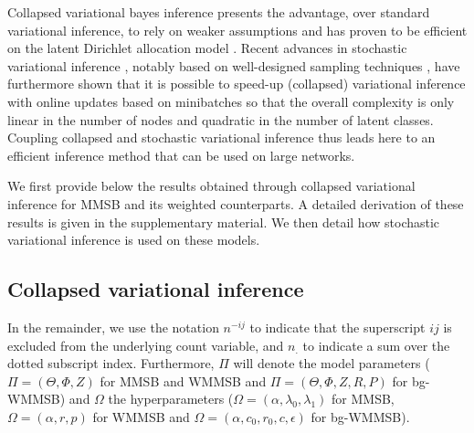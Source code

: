 Collapsed variational bayes inference presents the advantage, over standard variational inference, to rely on weaker assumptions and has proven to be efficient on the latent Dirichlet allocation model \cite{teh2006collapsed}. Recent advances in stochastic variational inference \cite{hoffman2013stochastic}, notably based on well-designed sampling techniques \cite{gopalan2013efficient,kim2013efficient}, have furthermore shown that it is possible to speed-up (collapsed) variational inference with online updates based on minibatches so that the overall complexity is only linear in the number of nodes and quadratic in the number of latent classes. Coupling collapsed and stochastic variational inference thus leads here to an efficient inference method that can be used on large networks.

We first provide below the results obtained through collapsed variational inference for MMSB and its weighted counterparts. A detailed derivation of these results is given in the supplementary material. We then detail how stochastic variational inference is used on these models.

\subsection{Collapsed variational inference}

In the remainder, we use the notation $n^{-ij}$ to indicate that the superscript $ij$ is excluded from the underlying count variable, and $n_{\bm{.}}$ to indicate a sum over the dotted subscript index. Furthermore, $\Pi$ will denote the model parameters ($\Pi = (\Theta,\Phi,Z)$ for MMSB and WMMSB and $\Pi = (\Theta,\Phi,Z,R,P)$ for bg-WMMSB) and $\Omega$ the hyperparameters ($\Omega = (\alpha,\lambda_0,\lambda_1)$ for MMSB, $\Omega = (\alpha,r,p)$ for WMMSB and $\Omega = (\alpha, c_0, r_0, c, \epsilon)$ for bg-WMMSB). 

